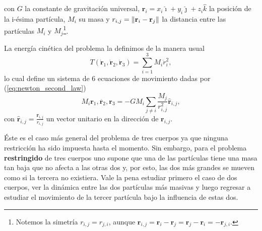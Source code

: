 con $G$ la constante de gravitación universal, $\mathbf{r}_i = x_i \hat{\imath} + y_i \hat{\jmath} + z_i \hat{k}$ la posición de la i-ésima partícula, $M_i$ su masa y $r_{i,j} = \left\lVert \mathbf{r}_i - \mathbf{r}_j\right\rVert$ la distancia entre las partículas $M_i$ y $M_j$\footnote{Notemos la simetría $r_{i,j} = r_{j,i}$, aunque $\mathbf{r}_{i,j} = \mathbf{r}_i - \mathbf{r}_j = \mathbf{r}_j - \mathbf{r}_i  = - \mathbf{r}_{j,i}$.}. 

La energía cinética del problema la definimos de la manera usual 
\begin{equation}
 T(\dot{\mathbf{r}}_1,\dot{\mathbf{r}}_2,\dot{\mathbf{r}}_3) = \sum_{i=1}^3 M_i \dot{r}_i^2,
 \label{eq:3body_cinetic}
\end{equation}
lo cual define un sistema de 6 ecuaciones de movimiento dadas por (\ref{eq:newton_second_law})
\begin{equation}
 M_i \ddot{\mathbf{r}_1,\mathbf{r}_2,\mathbf{r}_3} = - G M_i \sum_{j\neq i} \frac{M_j}{r_{i,j}^2} \hat{\mathbf{r}}_{i,j},
 \label{eq:3body_eqs_motion}
\end{equation}
con $\hat{\mathbf{r}}_{i,j} = \frac{\mathbf{r}_{i,j}}{r_{i,j}}$ un vector unitario en la dirección de $\mathbf{r}_{i,j}$.

Éste es el caso más general del problema de tres cuerpos ya que ninguna restricción ha sido impuesta hasta el momento. Sin embargo, para el problema \textbf{restringido} de tres cuerpos uno supone que una de las partículas tiene una masa tan baja que no afecta a las otras dos y, por esto, las dos más grandes se mueven como si la tercera no existiera. Vale la pena estudiar primero el caso de dos cuerpos, ver la dinámica entre las dos partículas más masivas y luego regresar a estudiar el movimiento de la tercer partícula bajo la influencia de estas dos. 

